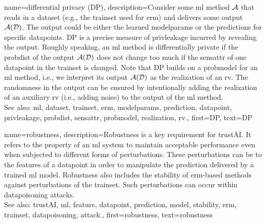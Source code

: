 {name={differential privacy (DP)},
  description={Consider some \gls{ml} method $\mathcal{A}$ 
  	that reads in a \gls{dataset} (e.g., the \gls{trainset} 
  	used for \gls{erm}) and delivers some output $\mathcal{A}(\mathcal{D})$. The output 
  	could be either the learned \gls{modelparams} or the \glspl{prediction} for specific \glspl{datapoint}. 
  	DP is a precise measure of \gls{privleakage} incurred by revealing the 
  	output. Roughly speaking, an \gls{ml} method is differentially private if the \gls{probdist} 
  	of the output $\mathcal{A}(\mathcal{D})$ does not change too much if the \gls{sensattr} 
  	of one \gls{datapoint} in the \gls{trainset} is changed. Note that DP 
  	builds on a \gls{probmodel} for an \gls{ml} method, i.e., we interpret its output $\mathcal{A}(\mathcal{D})$ 
  	as the \gls{realization} of an \gls{rv}. The randomness in the output can be ensured 
  	by intentionally adding the \gls{realization} of an auxiliary \gls{rv} (i.e., adding noise) to 
  	the output of the \gls{ml} method.
				\\ 
	See also: \gls{ml}, \gls{dataset}, \gls{trainset}, \gls{erm}, \gls{modelparams}, \gls{prediction}, \gls{datapoint}, \gls{privleakage}, \gls{probdist}, \gls{sensattr}, \gls{probmodel}, \gls{realization}, \gls{rv}.}, 
  first={DP}, 
  text={DP} 
}

{name={robustness},
	description={Robustness is a key requirement for \gls{trustAI}. It
		refers to the property of an \gls{ml} system to maintain acceptable performance even when 
		subjected to different forms of perturbations. These perturbations can be to the \glspl{feature} 
		of a \gls{datapoint} in order to manipulate the \gls{prediction} delivered by a trained \gls{ml} \gls{model}. 
		Robustness also includes the \gls{stability} of \gls{erm}-based methods against perturbations 
		of the \gls{trainset}. Such perturbations can occur within \gls{datapoisoning} \glspl{attack}. 
		\\ 
		See also: \gls{trustAI}, \gls{ml}, \gls{feature}, \gls{datapoint}, \gls{prediction}, \gls{model}, \gls{stability}, \gls{erm}, \gls{trainset}, \gls{datapoisoning}, \gls{attack}.}, 
	first={robustness}, 
	text={robustness} 
}


